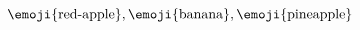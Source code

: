 \documentclass[t]{ctexbeamer}
\begin{document}
\begin{frame}
  \begin{preview}
    $\displaystyle \text{\emoji{red-apple}}, \text{\emoji{banana}}, \text{\emoji{pineapple}}$
  \end{preview}
\end{frame}
\end{document}
